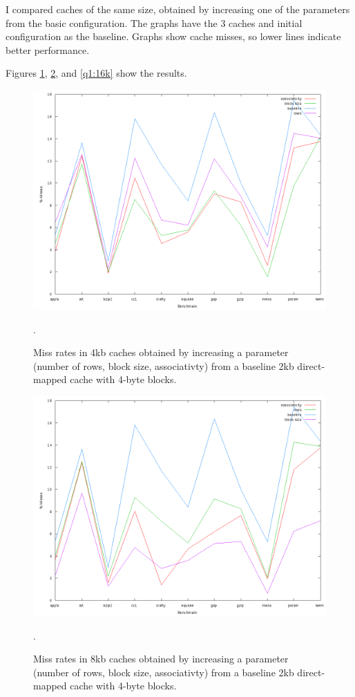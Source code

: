 I compared caches of the same size, obtained by increasing one of the
parameters from the basic configuration. The graphs have the 3 caches and
initial configuration as the baseline. Graphs show cache misses, so lower lines
indicate better performance.

Figures \ref{q1:4k}, \ref{q1:8k}, and \ref{q1:16k} show the results.

\begin{figure}[htb]
  \includegraphics[width=6.8in]{6.823/lab2/figs/ccc_4k.png}
  \caption{Miss rates in 4kb caches obtained by increasing a parameter
  (number of rows, block size, associativty) from a baseline 2kb direct-mapped
  cache with 4-byte blocks.} \label{q1:4k}.
\end{figure}

\begin{figure}[htb]
  \includegraphics[width=6.8in]{6.823/lab2/figs/ccc_8k.png}
  \caption{Miss rates in 8kb caches obtained by increasing a parameter
  (number of rows, block size, associativty) from a baseline 2kb direct-mapped
  cache with 4-byte blocks.} \label{q1:8k}.
\end{figure}


